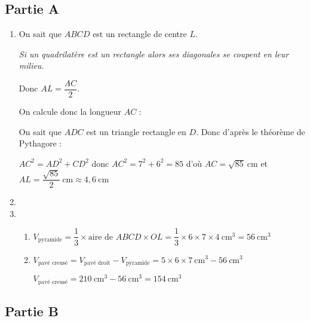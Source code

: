 \subsection*{Partie A}
\begin{enumerate}
\item On sait que $ABCD$ est un rectangle de centre $L$.

\textit{Si un quadrilatère est un rectangle alors ses diagonales se coupent en leur milieu.}

Donc $AL =\dfrac{AC}{2}$. 

On calcule donc la longueur $AC$ :

On sait que $ADC$ est un triangle rectangle en $D$. Donc d’après le théorème de Pythagore :

$AC^2 = AD^2 + CD^2$ donc $AC^2 = 7^2+ 6^2= 85$ d'où $AC = \sqrt{85}~\text{cm}$ et $AL = \dfrac{\sqrt{85}}{2}~\text{cm} \approx 4,6~\text{cm}$

\item 
{}

\item
\begin{enumerate}
	\item $V_{\text{pyramide}} = \dfrac{1}{3}\times \text{aire de $ABCD$} \times OL = \dfrac{1}{3}\times 6 \times 7 \times 4~\text{cm}^3=56~\text{cm}^3$
	\item $V_{\text{pavé creusé}} = V_{\text{pavé droit}} - V_{\text{pyramide}} = 5\times 6\times 7~\text{cm}^3 - 56~\text{cm}^3$
	
	$V_{\text{pavé creusé}} =  210~\text{cm}^3 - 56~\text{cm}^3=154~\text{cm}^3$
\end{enumerate}
\end{enumerate}

\subsection*{Partie B}

